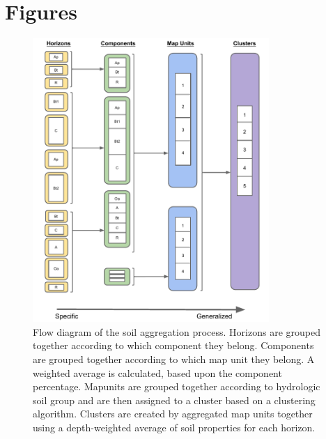 \begin{landscape}
	
	
\end{landscape}
\section{Figures}

\begin{figure}[H]
	\centering
	\includegraphics[width=0.8\textwidth]{./img/aggregation_flow_diagram}
	\caption[Flow diagram of the soil aggregation process]{Flow diagram of the soil aggregation process. Horizons are grouped together according to which component they belong. Components are grouped together according to which map unit they  belong. A weighted average is calculated, based upon the component percentage. Mapunits are grouped together according to hydrologic soil group  and are then assigned to a cluster based on a clustering algorithm. Clusters are created by aggregated map units together using a depth-weighted average of soil properties for each horizon.}
	\label{fig:agg_flow_diagram}
\end{figure}

